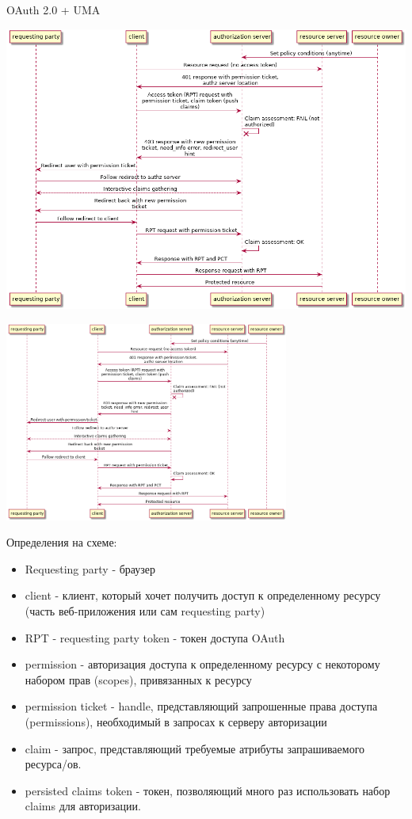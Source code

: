 \documentclass[presentation]{beamer}
\begin{document}
\begin{frame}[label={sec:orga6e4dcc}]{OAuth 2.0 + UMA}
\begin{center}
\includegraphics[width=.9\linewidth]{img/uma.png}
\end{center}
\begin{center}
\includegraphics[width=0.7\textwidth]{img/uma.png}
\end{center}

\begin{block}{Определения на схеме:}
\begin{itemize}
\item Requesting party - браузер
\item client - клиент, который хочет получить доступ к определенному ресурсу (часть веб-приложения или сам requesting party)
\item RPT - requesting party token - токен доступа OAuth
\item permission - авторизация доступа к определенному ресурсу с некоторому набором прав (scopes), привязанных к ресурсу
\item permission ticket - handle, представляющий запрошенные права доступа (permissions), необходимый в запросах к серверу авторизации
\item claim - запрос, представляющий требуемые атрибуты запрашиваемого ресурса/ов.
\item persisted claims token - токен, позволяющий много раз использовать набор claims для авторизации.
\end{itemize}
\end{block}
\end{frame}
\end{document}

